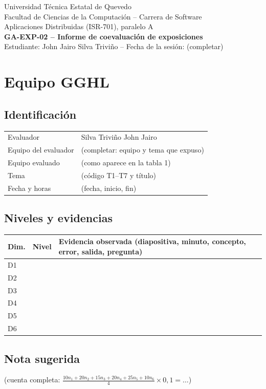 \documentclass[11pt,a4paper]{article}
\begin{document}
\begin{center}
{\large Universidad Técnica Estatal de Quevedo}\\
Facultad de Ciencias de la Computación -- Carrera de Software\\
Aplicaciones Distribuidas (ISR-701), paralelo A\\
\textbf{GA-EXP-02 -- Informe de coevaluación de exposiciones}\\
Estudiante: John Jairo Silva Triviño -- Fecha de la sesión: (completar)
\end{center}
\section{Equipo GGHL}
\subsection*{Identificación}
\begin{tabular}{@{}p{4cm}p{10cm}@{}}
Evaluador & Silva Triviño John Jairo\\
Equipo del evaluador & (completar: equipo y tema que expuso)\\
Equipo evaluado & (como aparece en la tabla 1)\\
Tema & (código T1--T7 y título)\\
Fecha y horas & (fecha, inicio, fin)\\
\end{tabular}
\subsection*{Niveles y evidencias}
\begin{tabular}{@{}lcp{11cm}@{}}
\toprule
Dim. & Nivel & Evidencia observada (diapositiva, minuto, concepto, error, salida, pregunta)\\
\midrule
D1 & & \\
D2 & & \\
D3 & & \\
D4 & & \\
D5 & & \\
D6 & & \\
\bottomrule
\end{tabular}
\subsection*{Nota sugerida}
(cuenta completa: $\frac{10 n_1+20 n_2+15 n_3+20 n_4+25 n_5+10 n_6}{4}\times 0{,}1 = \dots$)
\end{document}
